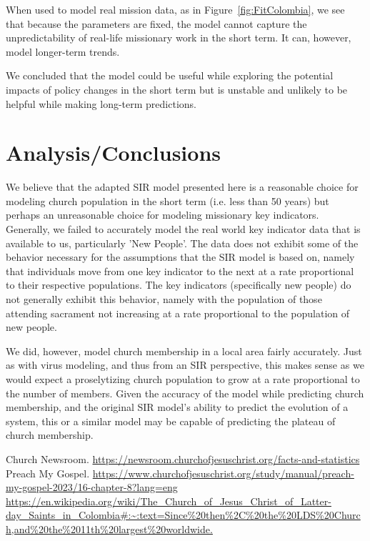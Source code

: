\documentclass[11pt]{amsart}
\begin{document}
When used to model real mission data, as in Figure~\ref{fig:FitColombia}, we see that because the parameters are fixed, the model cannot capture the unpredictability of real-life missionary work in the short term. It can, however, model longer-term trends.

We concluded that the model could be useful while exploring the potential impacts of policy changes in the short term but is unstable and unlikely to be helpful while making long-term predictions. 

\section{Analysis/Conclusions}

We believe that the adapted SIR model presented here is a reasonable choice for modeling church population in the short term (i.e. less than 50 years) but perhaps an unreasonable choice for modeling missionary key indicators. Generally, we failed to accurately model the real world key indicator data that is available to us, particularly 'New People'. The data does not exhibit some of the behavior necessary for the assumptions that the SIR model is based on, namely that individuals move from one key indicator to the next at a rate proportional to their respective populations. The key indicators (specifically new people) do not generally exhibit this behavior, namely with the population of those attending sacrament not increasing at a rate proportional to the population of new people.

We did, however, model church membership in a local area fairly accurately. Just as with virus modeling, and thus from an SIR perspective, this makes sense as we would expect a proselytizing church population to grow at a rate proportional to the number of members. Given the accuracy of the model while predicting church membership, and the original SIR model's ability to predict the evolution of a system, this or a similar model may be capable of predicting the plateau of church membership.


\FloatBarrier %
\newpage
%

\begin{thebibliography}{99}
 Church Newsroom. \url{https://newsroom.churchofjesuschrist.org/facts-and-statistics}
 Preach My Gospel. \url{https://www.churchofjesuschrist.org/study/manual/preach-my-gospel-2023/16-chapter-8?lang=eng}
 \url{https://en.wikipedia.org/wiki/The_Church_of_Jesus_Christ_of_Latter-day_Saints_in_Colombia#:~:text=Since%20then%2C%20the%20LDS%20Church,and%20the%2011th%20largest%20worldwide.}
\end{thebibliography}
\end{document}
